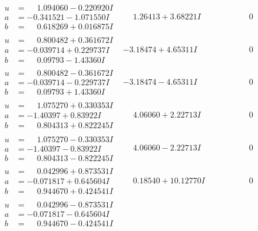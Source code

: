 \documentclass[1p]{elsarticle_modified}
\theoremstyle{definition}
\begin{document}
$$\begin{array}{c|c|c}
\begin{aligned}
u &= \phantom{-}1.094060 - 0.220920 I \\
a &= -0.341521 - 1.071550 I \\
b &= \phantom{-}0.618269 + 0.016875 I\end{aligned}
 & \phantom{-}1.26413 + 3.68221 I & \phantom{-0.000000 } 0 \\ \hline\begin{aligned}
u &= \phantom{-}0.800482 + 0.361672 I \\
a &= -0.039714 + 0.229737 I \\
b &= \phantom{-}0.09793 - 1.43360 I\end{aligned}
 & -3.18474 + 4.65311 I & \phantom{-0.000000 } 0 \\ \hline\begin{aligned}
u &= \phantom{-}0.800482 - 0.361672 I \\
a &= -0.039714 - 0.229737 I \\
b &= \phantom{-}0.09793 + 1.43360 I\end{aligned}
 & -3.18474 - 4.65311 I & \phantom{-0.000000 } 0 \\ \hline\begin{aligned}
u &= \phantom{-}1.075270 + 0.330353 I \\
a &= -1.40397 + 0.83922 I \\
b &= \phantom{-}0.804313 + 0.822245 I\end{aligned}
 & \phantom{-}4.06060 + 2.22713 I & \phantom{-0.000000 } 0 \\ \hline\begin{aligned}
u &= \phantom{-}1.075270 - 0.330353 I \\
a &= -1.40397 - 0.83922 I \\
b &= \phantom{-}0.804313 - 0.822245 I\end{aligned}
 & \phantom{-}4.06060 - 2.22713 I & \phantom{-0.000000 } 0 \\ \hline\begin{aligned}
u &= \phantom{-}0.042996 + 0.873531 I \\
a &= -0.071817 + 0.645604 I \\
b &= \phantom{-}0.944670 + 0.424541 I\end{aligned}
 & \phantom{-}0.18540 + 10.12770 I & \phantom{-0.000000 } 0 \\ \hline\begin{aligned}
u &= \phantom{-}0.042996 - 0.873531 I \\
a &= -0.071817 - 0.645604 I \\
b &= \phantom{-}0.944670 - 0.424541 I\end{aligned}

\end{array}$$
\end{document}
